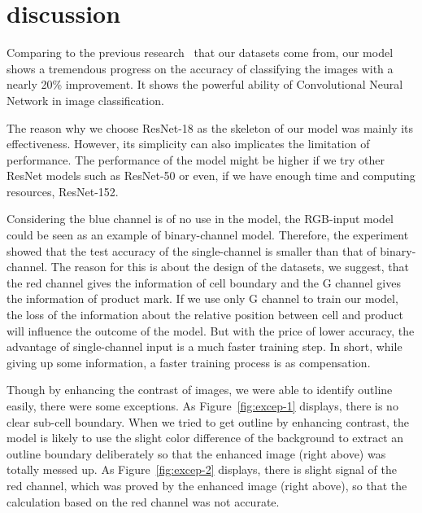 \documentclass[12pt]{article}
\begin{document}
\section*{discussion}
\par Comparing to the previous research~\cite{chong2015yeast} that our datasets come from, our model shows a tremendous progress on the accuracy of classifying the images with a nearly 20\% improvement. It shows the powerful ability of Convolutional Neural Network in image classification.
\par The reason why we choose ResNet-18 as the skeleton of our model was mainly its effectiveness. However, its simplicity can also implicates the limitation of performance. The performance of the model might be higher if we try other ResNet models such as ResNet-50 or even, if we have enough time and computing resources, ResNet-152.
\par Considering the blue channel is of no use in the model, the RGB-input model could be seen as an example of binary-channel model. Therefore, the experiment showed that the test accuracy of the single-channel is smaller than that of binary-channel. The reason for this is about the design of the datasets, we suggest, that the red channel gives the information of cell boundary and the G channel gives the information of product mark. If we use only G channel to train our model, the loss of the information about the relative position between cell and product will influence the outcome of the model. But with the price of lower accuracy, the advantage of single-channel input is a much faster training step. In short, while giving up some information, a faster training process is as compensation.
\par Though by enhancing the contrast of images, we were able to identify outline easily, there were some exceptions. As Figure~\ref{fig:excep-1} displays, there is no clear sub-cell boundary. When we tried to get outline by enhancing contrast, the model is likely to use the slight color difference of the background to extract an outline boundary deliberately so that the enhanced image (right above) was totally messed up. As Figure~\ref{fig:excep-2} displays, there is slight signal of the red channel, which was proved by the enhanced image (right above), so that the calculation based on the red channel was not accurate.
\end{document}
